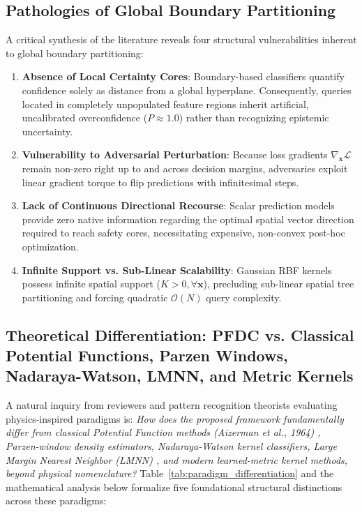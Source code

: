 \documentclass[preprint,review,12pt]{elsarticle}
\begin{document}
\subsection{Pathologies of Global Boundary Partitioning}
\label{sec:pathologies}
A critical synthesis of the literature reveals four structural vulnerabilities inherent to global boundary partitioning:
\begin{enumerate}
    \item \textbf{Absence of Local Certainty Cores}: Boundary-based classifiers quantify confidence solely as distance from a global hyperplane. Consequently, queries located in completely unpopulated feature regions inherit artificial, uncalibrated overconfidence ($P \approx 1.0$) rather than recognizing epistemic uncertainty.
    \item \textbf{Vulnerability to Adversarial Perturbation}: Because loss gradients $\nabla_{\mathbf{x}} \mathcal{L}$ remain non-zero right up to and across decision margins, adversaries exploit linear gradient torque to flip predictions with infinitesimal steps.
    \item \textbf{Lack of Continuous Directional Recourse}: Scalar prediction models provide zero native information regarding the optimal spatial vector direction required to reach safety cores, necessitating expensive, non-convex post-hoc optimization.
    \item \textbf{Infinite Support vs. Sub-Linear Scalability}: Gaussian RBF kernels possess infinite spatial support ($K > 0, \forall \mathbf{x}$), precluding sub-linear spatial tree partitioning and forcing quadratic $\mathcal{O}(N)$ query complexity.
\end{enumerate}

\subsection{Theoretical Differentiation: PFDC vs. Classical Potential Functions, Parzen Windows, Nadaraya-Watson, LMNN, and Metric Kernels}
\label{sec:theoretical_diff}
A natural inquiry from reviewers and pattern recognition theorists evaluating physics-inspired paradigms is: \emph{How does the proposed framework fundamentally differ from classical Potential Function methods (Aizerman et al., 1964) \cite{aizerman1964theoretical}, Parzen-window density estimators, Nadaraya-Watson kernel classifiers, Large Margin Nearest Neighbor (LMNN) \cite{weinberger2009distance}, and modern learned-metric kernel methods, beyond physical nomenclature?} Table~\ref{tab:paradigm_differentiation} and the mathematical analysis below formalize five foundational structural distinctions across these paradigms:
\end{document}
